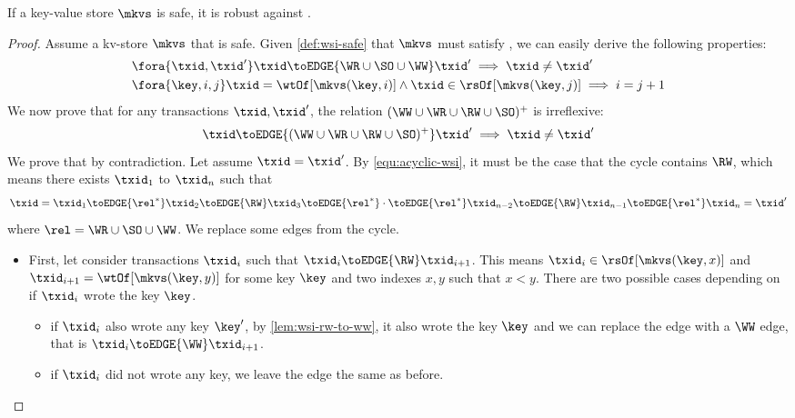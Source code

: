 \begin{theorem}
    If a key-value store \( \mkvs \) is \WSI safe, it is robust against \WSI.
\end{theorem}
\begin{proof}
    Assume a kv-store \( \mkvs \) that is \WSI safe.
    Given \cref{def:wsi-safe} that \( \mkvs \) must satisfy \WSI, we can easily derive the following properties:
    \begin{align}
        & \fora{\txid, \txid'} \txid \toEDGE{\WR \cup \SO \cup \WW}  \txid' \implies \txid \neq \txid' \label{equ:acyclic-wsi}\\
        & \fora{\key,i,j} \txid = \wtOf[\mkvs(\key,i)] \land \txid \in \rsOf[\mkvs(\key,j)] \implies i = j + 1 \label{equ:wsi-sat-ua} 
    \end{align}
    We now prove that for any transactions \( \txid, \txid'\), the relation \( (\WW \cup \WR \cup \RW \cup \SO)^+ \) is irreflexive:
    \[
        \txid \toEDGE{(\WW \cup \WR \cup \RW \cup \SO)^+} \txid' \implies \txid \neq \txid'
    \]
    We prove that by contradiction.
    Let assume \( \txid = \txid' \).
    By \cref{equ:acyclic-wsi}, it must be the case that the cycle contains \( \RW \), 
    which means there exists \( \txid_1 \) to \( \txid_n \)  such that
    \[
        \txid = \txid_1 \toEDGE{\rel^*} \txid_2 \toEDGE{\RW} \txid_3 \toEDGE{\rel^*} \cdot \toEDGE{\rel^*} \txid_{n-2} \toEDGE{\RW} \txid_{n-1} \toEDGE{\rel^*}  \txid_n = \txid' 
    \]
    where \( \rel  = \WR \cup \SO \cup \WW \).
    We replace some edges from the cycle.
    \begin{itemize}
        \item First, let consider transactions \( \txid_i \) such that \( \txid_i \toEDGE{\RW} \txid_{i+1}\).
    This means \( \txid_i \in \rsOf[ \mkvs(\key, x ) ]\) 
    and \( \txid_{i+1} = \wtOf[ \mkvs(\key, y ) ] \) for some key \( \key \) and two indexes \( x,y \) such that \( x < y \).
    There are two possible cases depending on if \( \txid_i\) wrote the key \( \key \).
        \begin{itemize}
            \item if \( \txid_i \) also wrote any key \( \key' \), 
                by \cref{lem:wsi-rw-to-ww}, it also wrote the key \( \key \) 
                and we can replace the edge with a \( \WW \) edge, that is \( \txid_i \toEDGE{\WW} \txid_{i+1}\).
            \item if \( \txid_i \) did not wrote any key, we leave the edge the same as before.
        \end{itemize}

\end{itemize}
\end{proof}

